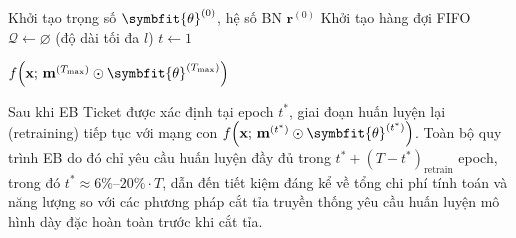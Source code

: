 \begin{algorithm}[H]
    \DontPrintSemicolon
    \SetAlgoLined


    \BlankLine
    Khởi tạo trọng số $\symbfit{\theta}^{(0)}$, hệ số BN $\mathbf{r}^{(0)}$\;
    Khởi tạo hàng đợi FIFO $\mathcal{Q} \leftarrow \varnothing$ (độ dài tối đa $l$)\;
    $t \leftarrow 1$\;

    \BlankLine
    \Return \ensuremath{f\!\left(\mathbf{x};\,\mathbf{m}^{(T_{\max})} \odot \symbfit{\theta}^{(T_{\max})}\right)}

    \caption{Tìm kiếm Early-Bird Ticket (EB Search)}
    \label{alg:eb_search}
\end{algorithm}
\bigskip
Sau khi EB Ticket được xác định tại epoch $t^*$, giai đoạn huấn luyện lại (retraining) tiếp tục
với mạng con $f\!\left(\mathbf{x};\,\mathbf{m}^{(t^*)} \odot \symbfit{\theta}^{(t^*)}\right)$.
Toàn bộ quy trình EB do đó chỉ yêu cầu huấn luyện đầy đủ trong $t^* + (T - t^*)_{\text{retrain}}$
epoch, trong đó $t^* \approx 6\%$--$20\% \cdot T$, dẫn đến tiết kiệm đáng kể về tổng chi phí tính toán
và năng lượng so với các phương pháp cắt tỉa truyền thống yêu cầu huấn luyện mô hình dày đặc
hoàn toàn trước khi cắt tỉa.

